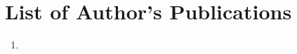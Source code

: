 \chapter*{List of Author's Publications}
\label{publish}

\begin{enumerate}
\item [None to date.]
\end{enumerate}
